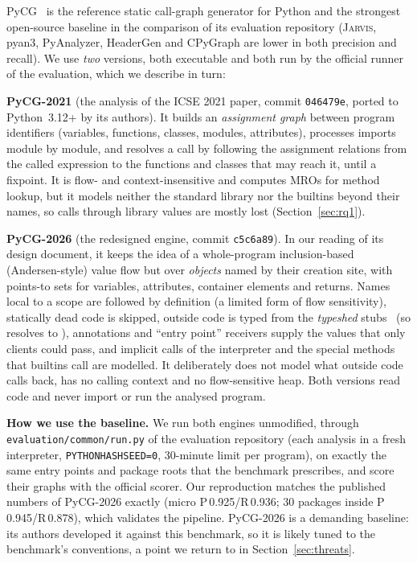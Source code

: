 PyCG~\cite{salis2021pycg} is the reference static call-graph generator for
Python and the strongest open-source baseline in the comparison of its
evaluation repository (\textsc{Jarvis}, pyan3, PyAnalyzer, HeaderGen and
CPyGraph are lower in both precision and recall). We use \emph{two} versions,
both executable and both run by the official runner of the
evaluation, which we describe in turn:

\textbf{PyCG-2021} (the analysis of the ICSE 2021 paper, commit
\texttt{046479e}, ported to Python~3.12+ by its authors). It builds an
\emph{assignment graph} between program identifiers (variables, functions,
classes, modules, attributes), processes imports module by module, and
resolves a call by following the assignment relations from the called
expression to the functions and classes that may reach it, until a fixpoint.
It is flow- and context-insensitive and computes MROs for method lookup, but it
models neither the standard library nor the builtins beyond their names, so calls through library values are mostly lost (Section~\ref{sec:rq1}).

\textbf{PyCG-2026} (the redesigned engine, commit \texttt{c5c6a89}). In our
reading of its design document, it keeps the idea of a whole-program
inclusion-based (Andersen-style) value flow but over \emph{objects} named by
their creation site, with points-to sets for variables, attributes, container
elements and returns. Names local to a scope are followed by definition (a
limited form of flow sensitivity), statically dead code is skipped, outside
code is typed from the \emph{typeshed} stubs~\cite{typeshed} (so 
resolves to ), annotations and ``entry point''
receivers supply the values that only clients could pass, and implicit calls
of the interpreter and the special methods that builtins call are modelled.
It deliberately does not model what outside code calls back, has no calling
context and no flow-sensitive heap. Both versions read
code and never import or run the analysed program.

\textbf{How we use the baseline.} We run both engines unmodified, through
\texttt{evaluation/common/run.py} of the evaluation repository (each analysis
in a fresh interpreter, \texttt{PYTHONHASHSEED=0}, 30-minute limit per
program), on exactly the same entry points and package roots that the
benchmark prescribes, and score their graphs with the official scorer. Our
reproduction matches the published numbers of PyCG-2026 exactly (micro
P\,0.925/R\,0.936; 30 packages inside P\,0.945/R\,0.878), which validates the
pipeline. PyCG-2026 is a demanding baseline: its authors developed it against
this benchmark, so it is likely tuned to the benchmark's conventions, a point
we return to in Section~\ref{sec:threats}.
